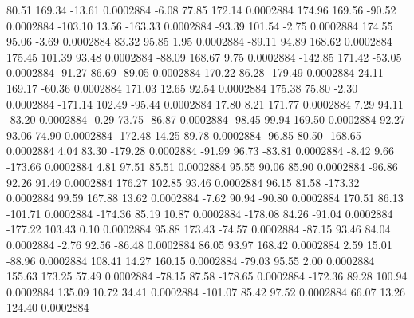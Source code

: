        80.51      169.34      -13.61     0.0002884
       -6.08       77.85      172.14     0.0002884
      174.96      169.56      -90.52     0.0002884
     -103.10       13.56     -163.33     0.0002884
      -93.39      101.54       -2.75     0.0002884
      174.55       95.06       -3.69     0.0002884
       83.32       95.85        1.95     0.0002884
      -89.11       94.89      168.62     0.0002884
      175.45      101.39       93.48     0.0002884
      -88.09      168.67        9.75     0.0002884
     -142.85      171.42      -53.05     0.0002884
      -91.27       86.69      -89.05     0.0002884
      170.22       86.28     -179.49     0.0002884
       24.11      169.17      -60.36     0.0002884
      171.03       12.65       92.54     0.0002884
      175.38       75.80       -2.30     0.0002884
     -171.14      102.49      -95.44     0.0002884
       17.80        8.21      171.77     0.0002884
        7.29       94.11      -83.20     0.0002884
       -0.29       73.75      -86.87     0.0002884
      -98.45       99.94      169.50     0.0002884
       92.27       93.06       74.90     0.0002884
     -172.48       14.25       89.78     0.0002884
      -96.85       80.50     -168.65     0.0002884
        4.04       83.30     -179.28     0.0002884
      -91.99       96.73      -83.81     0.0002884
       -8.42        9.66     -173.66     0.0002884
        4.81       97.51       85.51     0.0002884
       95.55       90.06       85.90     0.0002884
      -96.86       92.26       91.49     0.0002884
      176.27      102.85       93.46     0.0002884
       96.15       81.58     -173.32     0.0002884
       99.59      167.88       13.62     0.0002884
       -7.62       90.94      -90.80     0.0002884
      170.51       86.13     -101.71     0.0002884
     -174.36       85.19       10.87     0.0002884
     -178.08       84.26      -91.04     0.0002884
     -177.22      103.43        0.10     0.0002884
       95.88      173.43      -74.57     0.0002884
      -87.15       93.46       84.04     0.0002884
       -2.76       92.56      -86.48     0.0002884
       86.05       93.97      168.42     0.0002884
        2.59       15.01      -88.96     0.0002884
      108.41       14.27      160.15     0.0002884
      -79.03       95.55        2.00     0.0002884
      155.63      173.25       57.49     0.0002884
      -78.15       87.58     -178.65     0.0002884
     -172.36       89.28      100.94     0.0002884
      135.09       10.72       34.41     0.0002884
     -101.07       85.42       97.52     0.0002884
       66.07       13.26      124.40     0.0002884
